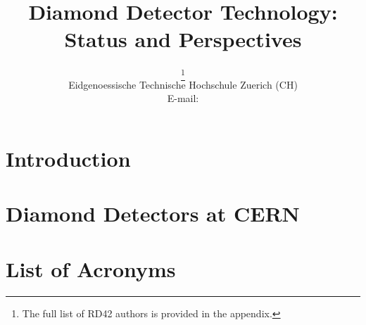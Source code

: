 \documentclass{PoS}
\title{Diamond Detector Technology: Status and Perspectives}
\author{\speaker{Michael Reichmann}%
        \thanks{The full list of RD42 authors is provided in the appendix.}\\
       Eidgenoessische Technische Hochschule Zuerich (CH)\\
       E-mail: \email{michael.reichmann@cern.ch}}
\begin{document}
\section{Introduction}


\section{Diamond Detectors at CERN}



\newpage
\section*{List of Acronyms}


\newpage


\end{document}

